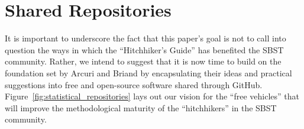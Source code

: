 
\vspace*{-.5em}

\section{Shared Repositories}
\label{sec:repositories}



It is important to underscore the fact that this paper's goal is not to call into question the ways in which the
``Hitchhiker's Guide'' has benefited the SBST community. Rather, we intend to suggest that it is now time to build on
the foundation set by Arcuri and Briand by encapsulating their ideas and practical suggestions into free and open-source
software shared through GitHub. Figure~\ref{fig:statistical_repositories} lays out our vision for the ``free vehicles''
that will improve the methodological maturity of the ``hitchhikers'' in the SBST community.
